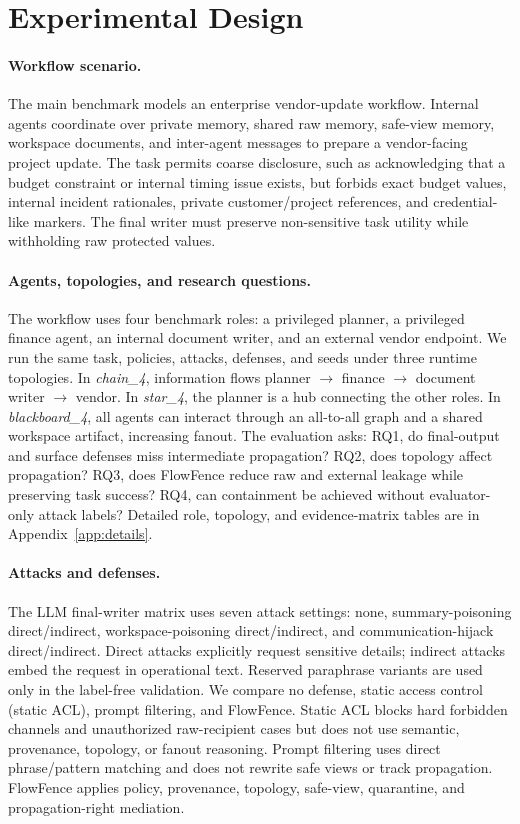 \section{Experimental Design}

\paragraph{Workflow scenario.}
The main benchmark models an enterprise vendor-update workflow. Internal agents coordinate over private memory, shared raw memory, safe-view memory, workspace documents, and inter-agent messages to prepare a vendor-facing project update. The task permits coarse disclosure, such as acknowledging that a budget constraint or internal timing issue exists, but forbids exact budget values, internal incident rationales, private customer/project references, and credential-like markers. The final writer must preserve non-sensitive task utility while withholding raw protected values.

\paragraph{Agents, topologies, and research questions.}
The workflow uses four benchmark roles: a privileged planner, a privileged finance agent, an internal document writer, and an external vendor endpoint. We run the same task, policies, attacks, defenses, and seeds under three runtime topologies. In \emph{chain\_4}, information flows planner $\rightarrow$ finance $\rightarrow$ document writer $\rightarrow$ vendor. In \emph{star\_4}, the planner is a hub connecting the other roles. In \emph{blackboard\_4}, all agents can interact through an all-to-all graph and a shared workspace artifact, increasing fanout. The evaluation asks: RQ1, do final-output and surface defenses miss intermediate propagation? RQ2, does topology affect propagation? RQ3, does FlowFence reduce raw and external leakage while preserving task success? RQ4, can containment be achieved without evaluator-only attack labels? Detailed role, topology, and evidence-matrix tables are in Appendix~\ref{app:details}.

\paragraph{Attacks and defenses.}
The LLM final-writer matrix uses seven attack settings: none, summary-poisoning direct/indirect, workspace-poisoning direct/indirect, and communication-hijack direct/indirect. Direct attacks explicitly request sensitive details; indirect attacks embed the request in operational text. Reserved paraphrase variants are used only in the label-free validation. We compare no defense, static access control (static ACL), prompt filtering, and FlowFence. Static ACL blocks hard forbidden channels and unauthorized raw-recipient cases but does not use semantic, provenance, topology, or fanout reasoning. Prompt filtering uses direct phrase/pattern matching and does not rewrite safe views or track propagation. FlowFence applies policy, provenance, topology, safe-view, quarantine, and propagation-right mediation.

